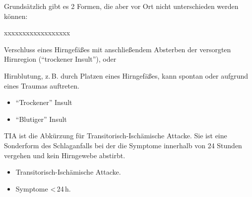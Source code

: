 
{%
Grundsätzlich gibt es 2 Formen, die aber vor Ort nicht
unterschieden werden können:
\begin{labeling}[~--]{xxxxxxxxxxxxxxxxxx}
  \item[\T{Trockener Insult}] Verschluss eines Hirngefäßes mit anschließendem
  Absterben der versorgten Hirnregion ("`trockener
  Insult"'), oder
  \item[\T{Blutiger Insult}] Hirnblutung, z.\,B. durch Platzen eines
  Hirngefäßes, kann spontan oder aufgrund eines Traumas auftreten.
\end{labeling}

}
{
\begin{itemize}
  \item "`Trockener"' Insult
  \item "`Blutiger"' Insult
\end{itemize}

}{}{}{}

{
TIA ist die Abkürzung für Transitorisch-Ischämische Attacke. Sie ist eine Sonderform des
Schlaganfalls bei der die Symptome innerhalb von 24 Stunden vergehen und kein
Hirngewebe abstirbt.
}
{
\begin{itemize}
  \item Transitorisch-Ischämische Attacke.
  \item Symptome <\,24\,h.
\end{itemize}

}{}{}{}



